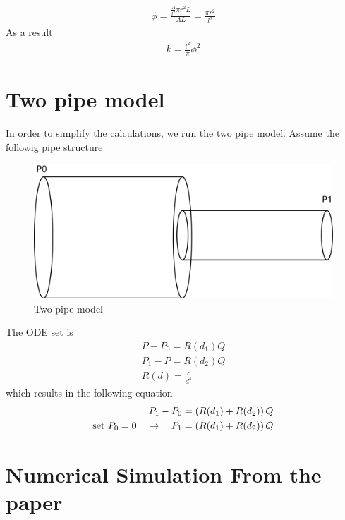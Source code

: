 \begin{align}
    \phi = \frac{\frac{A}{l^2} \pi r^2 L}{A L} = \frac{\pi r^2}{l^2}
\end{align}
%
As a result
%
\begin{align}
    k = \frac{l^2}{\pi} \phi^2
\end{align}



\section{Two pipe model}
%
In order to simplify the calculations, we run the two pipe
model. Assume the followig pipe structure
%
\begin{figure}[h]
 \centerline{\includegraphics[width=.5\textwidth]{./Figs/twopipes}}
\caption{Two pipe model}
\label{sup-fig4}
\end{figure}  
%
The ODE set is
%
\begin{align}
  P - P_0 = R(d_1) Q \\
  P_1 - P = R(d_2) Q \\
  R(d) = \frac{c}{d^4} 
\end{align}
%
which results in the following equation
%
\begin{align}
  P_1 - P_0 = \left( R(d_1) + R(d_2) \right) Q \\
  \text{set } P_{0} = 0 \quad \to \quad P_1  =  \left( R(d_1) + R(d_2) \right) Q 
\end{align}




\section{Numerical Simulation From the paper}



